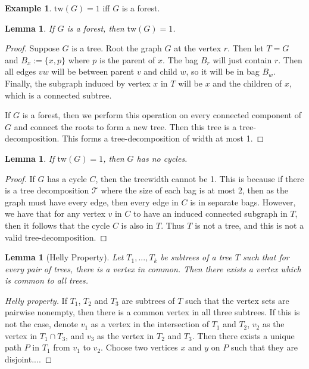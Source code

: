 \documentclass[]{article}
\newcommand{\tree}{\mathcal{T}}
\newcommand{\tw}{\text{tw}}
\newtheorem{lemma}[theorem]{Lemma}
\theoremstyle{definition}
\newtheorem{example}[theorem]{Example}
\numberwithin{theorem}{section}
\numberwithin{equation}{section}
\begin{document}
\begin{example}\label{ex:treewidth_forest}
	$\tw(G) = 1$ iff $G$ is a forest.
	\begin{lemma}
		If $G$ is a forest, then $\tw(G) = 1$.
	\end{lemma}
	\begin{proof}
		Suppose $G$ is a tree. Root the graph $G$ at the vertex $r$. Then let $T = G$ and $B_x:= \lbrace x, p \rbrace$ where $p$ is the parent of $x$. The bag $B_r$ will just contain $r$. Then all edges $vw$ will be between parent $v$ and child $w$, so it will be in bag $B_w$. Finally, the subgraph induced by vertex $x$ in $T$ will be $x$ and the children of $x$, which is a connected subtree.
		
		If $G$ is a forest, then we perform this operation on every connected component of $G$ and connect the roots to form a new tree. Then this tree is a tree-decomposition. This forms a tree-decomposition of width at most 1. 
	\end{proof}
	\begin{lemma}
		If $\tw(G) = 1$, then $G$ has no cycles.
	\end{lemma}
	\begin{proof}
		If $G$ has a cycle $C$, then the treewidth cannot be 1. This is because if there is a tree decomposition $\tree$ where the size of each bag is at most 2, then as the graph must have every edge, then every edge in $C$ is in separate bags. However, we have that for any vertex $v$ in $C$ to have an induced connected subgraph in $T$, then it follows that the cycle $C$ is also in $T$. Thus $T$ is not a tree, and this is not a valid tree-decomposition. 
	\end{proof}
\end{example}

\begin{lemma}[Helly Property]\label{lem:Helly}
	Let $T_1, ..., T_k$ be subtrees of a tree $T$ such that for every pair of trees, there is a vertex in common. Then there exists a vertex which is common to all trees.
\end{lemma}
\begin{proof}[Helly property]
	If $T_1$, $T_2$ and $T_3$ are subtrees of $T$ such that the vertex sets are pairwise nonempty, then there is a common vertex in all three subtrees. If this is not the case, denote $v_1$ as a vertex in the intersection of $T_1$ and $T_2$, $v_2$ as the vertex in $T_1 \cap T_3$, and $v_3$ as the vertex in $T_2$ and $T_3$. Then there exists a unique path $P$ in $T_1$ from $v_1$ to $v_2$. Choose two vertices $x$ and $y$ on $P$ such that they are disjoint....
\end{proof}
\end{document}
